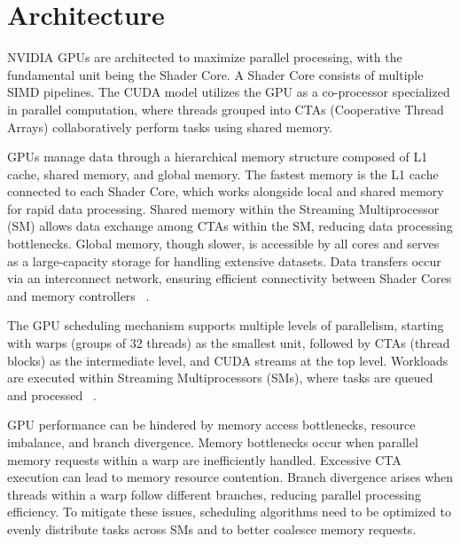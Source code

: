 \section{Architecture}

NVIDIA GPUs are architected to maximize parallel processing, with the fundamental unit being the Shader Core. A Shader Core consists of multiple SIMD pipelines. The CUDA model utilizes the GPU as a co-processor specialized in parallel computation, where threads grouped into CTAs (Cooperative Thread Arrays) collaboratively perform tasks using shared memory.

GPUs manage data through a hierarchical memory structure composed of L1 cache, shared memory, and global memory. The fastest memory is the L1 cache connected to each Shader Core, which works alongside local and shared memory for rapid data processing. Shared memory within the Streaming Multiprocessor (SM) allows data exchange among CTAs within the SM, reducing data processing bottlenecks. Global memory, though slower, is accessible by all cores and serves as a large-capacity storage for handling extensive datasets. Data transfers occur via an interconnect network, ensuring efficient connectivity between Shader Cores and memory controllers ~\cite{Bakhoda2009}.

The GPU scheduling mechanism supports multiple levels of parallelism, starting with warps (groups of 32 threads) as the smallest unit, followed by CTAs (thread blocks) as the intermediate level, and CUDA streams at the top level. Workloads are executed within Streaming Multiprocessors (SMs), where tasks are queued and processed ~\cite{Sanudo2020}.

GPU performance can be hindered by memory access bottlenecks, resource imbalance, and branch divergence. Memory bottlenecks occur when parallel memory requests within a warp are inefficiently handled. Excessive CTA execution can lead to memory resource contention. Branch divergence arises when threads within a warp follow different branches, reducing parallel processing efficiency. To mitigate these issues, scheduling algorithms need to be optimized to evenly distribute tasks across SMs and to better coalesce memory requests.

